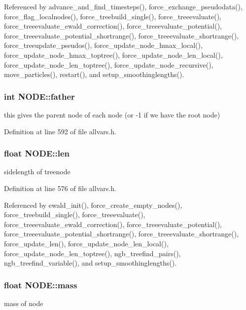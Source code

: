 Referenced by advance\_\-and\_\-find\_\-timesteps(), force\_\-exchange\_\-pseudodata(), force\_\-flag\_\-localnodes(), force\_\-treebuild\_\-single(), force\_\-treeevaluate(), force\_\-treeevaluate\_\-ewald\_\-correction(), force\_\-treeevaluate\_\-potential(), force\_\-treeevaluate\_\-potential\_\-shortrange(), force\_\-treeevaluate\_\-shortrange(), force\_\-treeupdate\_\-pseudos(), force\_\-update\_\-node\_\-hmax\_\-local(), force\_\-update\_\-node\_\-hmax\_\-toptree(), force\_\-update\_\-node\_\-len\_\-local(), force\_\-update\_\-node\_\-len\_\-toptree(), force\_\-update\_\-node\_\-recursive(), move\_\-particles(), restart(), and setup\_\-smoothinglengths().

\hypertarget{structNODE_a9a1b7edbe811165e40220f63a38f2d16}{
\subsubsection[{father}]{\setlength{\rightskip}{0pt plus 5cm}int {\bf NODE::father}}}
\label{structNODE_a9a1b7edbe811165e40220f63a38f2d16}
this gives the parent node of each node (or -\/1 if we have the root node) 

Definition at line 592 of file allvars.h.

\hypertarget{structNODE_aae35ad626e2613a4926d4e07fdf9be5c}{
\subsubsection[{len}]{\setlength{\rightskip}{0pt plus 5cm}float {\bf NODE::len}}}
\label{structNODE_aae35ad626e2613a4926d4e07fdf9be5c}
sidelength of treenode 

Definition at line 576 of file allvars.h.



Referenced by ewald\_\-init(), force\_\-create\_\-empty\_\-nodes(), force\_\-treebuild\_\-single(), force\_\-treeevaluate(), force\_\-treeevaluate\_\-ewald\_\-correction(), force\_\-treeevaluate\_\-potential(), force\_\-treeevaluate\_\-potential\_\-shortrange(), force\_\-treeevaluate\_\-shortrange(), force\_\-update\_\-len(), force\_\-update\_\-node\_\-len\_\-local(), force\_\-update\_\-node\_\-len\_\-toptree(), ngb\_\-treefind\_\-pairs(), ngb\_\-treefind\_\-variable(), and setup\_\-smoothinglengths().

\hypertarget{structNODE_adfb345bd40fc1835e54589b46622efda}{
\subsubsection[{mass}]{\setlength{\rightskip}{0pt plus 5cm}float {\bf NODE::mass}}}
\label{structNODE_adfb345bd40fc1835e54589b46622efda}
mass of node 

